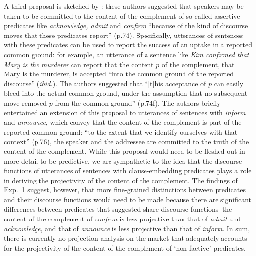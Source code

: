 \documentclass[11pt,fleqn]{article}
\newcommand{\6}{\mbox{$[\hspace*{-.6mm}[$}}
\newcommand{\9}{\mbox{$]\hspace*{-.6mm}]$}}
\begin{document}
{A third proposal is sketched by \citet{anand-hacquard2014}: these authors suggested that speakers may be taken to be committed to the content of the complement of so-called assertive predicates like {\em acknowledge, admit} and {\em confirm} ``because of the kind of discourse moves that these predicates report'' (p.74). Specifically, utterances of sentences with these predicates can be used to report the success of an uptake in a reported common ground: for example, an utterance of a sentence like {\em Kim confirmed that Mary is the murderer} can report that the content $p$ of the  complement, that Mary is the murderer, is accepted ``into the common ground of the reported discourse'' ({\em ibid.}). The authors suggested that ``[t]his acceptance of $p$ can easily bleed into the actual common ground, under the assumption that no subsequent move removed $p$ from the common ground'' (p.74f). The authors briefly entertained an extension of this proposal to utterances of sentences with {\em inform} and {\em announce}, which convey that the content of the complement is part of the reported common ground: ``to the extent that we identify ourselves with that context'' (p.76), the speaker and the addressee are committed to the truth of the content of the complement. While this proposal would need to be fleshed out in more detail to be predictive, we are sympathetic to the idea that the discourse functions of utterances of sentences with clause-embedding predicates plays a role in deriving the projectivity of the content of the complement. The findings of Exp.~1 suggest, however, that more fine-grained distinctions between predicates and their discourse functions would need to be made because there are significant differences between predicates that \citet{anand-hacquard2014} suggested share discourse functions: the content of the complement of {\em confirm} is less projective than that of {\em admit} and {\em acknowledge}, and that of {\em announce} is less projective than that of {\em inform}. In sum, there is currently no projection analysis on the market that adequately accounts for the projectivity of the content of the complement of `non-factive' predicates. 

}
\end{document}
